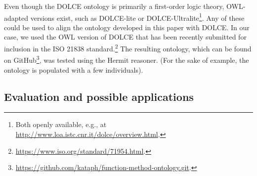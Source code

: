 \documentclass[sw]{iosart2x}
\newcommand{\DOLCE}{\textsc{DOLCE}\xspace} %
\newcommand{\OWL}{\textnormal{OWL}\xspace}
\begin{document}
Even though the \DOLCE ontology is primarily a first-order logic theory, \OWL-adapted versions exist, such as \DOLCE-lite or \DOLCE-Ultralite\footnote{Both openly available, e.g., at \url{http://www.loa.istc.cnr.it/dolce/overview.html}.}. 
Any of these could be used to align the ontology developed in this paper with \DOLCE. In our case, we used the \OWL version of \DOLCE that has been recently submitted for inclusion in the ISO 21838 standard.\footnote{\url{https://www.iso.org/standard/71954.html}.} The resulting ontology, which can be found on GitHub\footnote{\url{https://github.com/kataph/function-method-ontology.git}.}, was tested using the Hermit reasoner.
(For the sake of example, the ontology is populated with a few individuals).

\subsection{Evaluation and possible applications}
\end{document}
